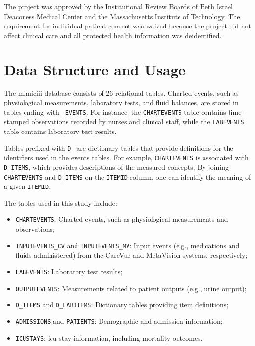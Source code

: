 The project was approved by the Institutional Review Boards of Beth Israel Deaconess Medical Center and the Massachusetts Institute of Technology. The requirement for individual patient consent was waived because the project did not affect clinical care and all protected health information was deidentified.

\section{Data Structure and Usage}
\label{sec:data-structure}

The \gls{mimiciii} database consists of 26 relational tables. Charted events, such as physiological measurements, laboratory tests, and fluid balances, are stored in tables ending with \texttt{\_EVENTS}. For instance, the \texttt{CHARTEVENTS} table contains time-stamped observations recorded by nurses and clinical staff, while the \texttt{LABEVENTS} table contains laboratory test results.

Tables prefixed with \texttt{D\_} are dictionary tables that provide definitions for the identifiers used in the events tables. For example, \texttt{CHARTEVENTS} is associated with \texttt{D\_ITEMS}, which provides descriptions of the measured concepts. By joining \texttt{CHARTEVENTS} and \texttt{D\_ITEMS} on the \texttt{ITEMID} column, one can identify the meaning of a given \texttt{ITEMID}.

The tables used in this study include:

\begin{itemize}
    \item \texttt{CHARTEVENTS}: Charted events, such as physiological measurements and observations;
    \item \texttt{INPUTEVENTS\_CV} and \texttt{INPUTEVENTS\_MV}: Input events (e.g., medications and fluids administered) from the CareVue and MetaVision systems, respectively;
    \item \texttt{LABEVENTS}: Laboratory test results;
    \item \texttt{OUTPUTEVENTS}: Measurements related to patient outputs (e.g., urine output);
    \item \texttt{D\_ITEMS} and \texttt{D\_LABITEMS}: Dictionary tables providing item definitions;
    \item \texttt{ADMISSIONS} and \texttt{PATIENTS}: Demographic and admission information;
    \item \texttt{ICUSTAYS}: \gls{icu} stay information, including mortality outcomes.
\end{itemize}

